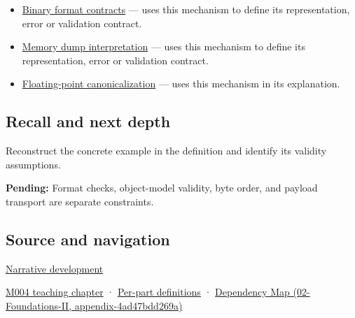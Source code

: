 \begin{itemize}
\item
  \hyperref[appendix-590bbb2424c1]{Binary format contracts} --- uses this mechanism to define its representation, error or validation contract.
\item
  \hyperref[appendix-230b59c0676b]{Memory dump interpretation} --- uses this mechanism to define its representation, error or validation contract.
\item
  \hyperref[appendix-e90053a4b201]{Floating-point canonicalization} --- uses this mechanism in its explanation.
\end{itemize}

\subsection{Recall and next depth}\label{recall-and-next-depth}

Reconstruct the concrete example in the definition and identify its validity assumptions.

\textbf{Pending:} Format checks, object-model validity, byte order, and payload transport are separate constraints.

\subsection{Source and navigation}\label{source-and-navigation}

\href{Continuous\%20Notes/Computing\%20Foundations\%20-\%20From\%20Bits\%20to\%20C++\%20and\%20Systems\%20APIs\#Bytes\%20become\%20a\%20durable\%20agreement}{Narrative development}

\href{Continuous\%20Notes/Computing\%20Foundations\%20-\%20From\%20Bits\%20to\%20C++\%20and\%20Systems\%20APIs\#A\%20stretching\%20ruler\%20for\%20real-valued\%20quantities}{M004 teaching chapter} · \hyperref[appendix-fd090d982a15]{Per-part definitions} · \href{}{Dependency Map (02-Foundations-II, appendix-4ad47bdd269a)}
